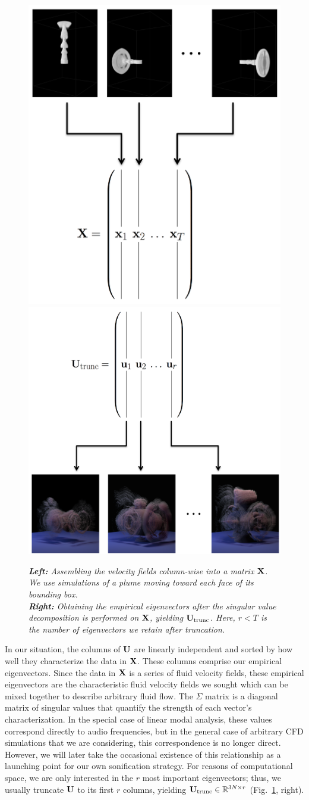 \documentclass[11pt]{article}
\begin{document}
\begin{figure}
		\centering
		\includegraphics[height=0.45\textwidth]{Figures/plume_training.png}
		\includegraphics[height=0.45\textwidth]{Figures/U_trunc_alt.png}
		\caption{{\em{\bf Left:} Assembling the velocity fields column-wise into a matrix $\mathbf{X}$. We use simulations of a plume moving toward each face of its bounding box.}\\{\em{\bf Right:} Obtaining the empirical eigenvectors after the singular value decomposition is performed on $\mathbf{X}$, yielding $\mathbf{U}_{\textnormal{trunc}}$. Here, $r<T$ is the number of eigenvectors we retain after truncation.}}
		\label{fig:matrices}
\end{figure}
	
In our situation, the columns of $\mathbf{U}$ are linearly independent and sorted by how well they characterize the data in $\mathbf{X}$. These columns comprise our empirical eigenvectors. Since the data in $\mathbf{X}$ is a series of fluid velocity fields, these empirical eigenvectors are the characteristic fluid velocity fields we sought which can be mixed together to describe arbitrary fluid flow. The $\Sigma$ matrix is a diagonal matrix of singular values that quantify the strength of each vector's characterization. In the special case of linear modal analysis, these values correspond directly to audio frequencies, but in the general case of arbitrary CFD simulations that we are considering, this correspondence is no longer direct. However, we will later take the occasional existence of this relationship as a launching point for our own sonification strategy. For reasons of computational space, we are only interested in the $r$ most important eigenvectors; thus, we usually truncate $\mathbf{U}$ to its first $r$ columns, yielding $\mathbf{U}_{\textnormal{trunc}} \in \mathbb{R}^{3N \times r}$ (Fig.~\ref{fig:matrices}, right).
\end{document}
